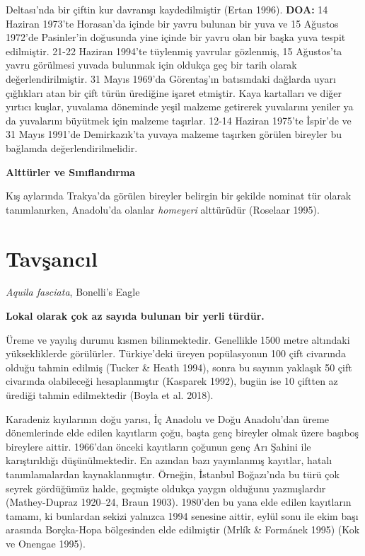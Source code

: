 \documentclass[
  letterpaper,
  DIV=11,
  numbers=noendperiod]{scrreprt}
\begin{document}
Deltası'nda bir çiftin kur davranışı kaydedilmiştir (Ertan 1996).
\textbf{DOA:} 14 Haziran 1973'te Horasan'da içinde bir yavru bulunan bir
yuva ve 15 Ağustos 1972'de Pasinler'in doğusunda yine içinde bir yavru
olan bir başka yuva tespit edilmiştir. 21-22 Haziran 1994'te tüylenmiş
yavrular gözlenmiş, 15 Ağustos'ta yavru görülmesi yuvada bulunmak için
oldukça geç bir tarih olarak değerlendirilmiştir. 31 Mayıs 1969'da
Görentaş'ın batısındaki dağlarda uyarı çığlıkları atan bir çift türün
ürediğine işaret etmiştir. Kaya kartalları ve diğer yırtıcı kuşlar,
yuvalama döneminde yeşil malzeme getirerek yuvalarını yeniler ya da
yuvalarını büyütmek için malzeme taşırlar. 12-14 Haziran 1975'te
İspir'de ve 31 Mayıs 1991'de Demirkazık'ta yuvaya malzeme taşırken
görülen bireyler bu bağlamda değerlendirilmelidir.

\textbf{Alttürler ve Sınıflandırma}

Kış aylarında Trakya'da görülen bireyler belirgin bir şekilde nominat
tür olarak tanımlanırken, Anadolu'da olanlar \emph{homeyeri} alttürüdür
(Roselaar 1995).

\section{Tavşancıl}\label{tavux15fancux131l}

\emph{Aquila fasciata}, Bonelli's Eagle

\textbf{Lokal olarak çok az sayıda bulunan bir yerli türdür.}

Üreme ve yayılış durumu kısmen bilinmektedir. Genellikle 1500 metre
altındaki yüksekliklerde görülürler. Türkiye'deki üreyen popülasyonun
100 çift civarında olduğu tahmin edilmiş (Tucker \& Heath 1994), sonra
bu sayının yaklaşık 50 çift civarında olabileceği hesaplanmıştır
(Kasparek 1992), bugün ise 10 çiftten az ürediği tahmin edilmektedir
(Boyla et al. 2018).

Karadeniz kıyılarının doğu yarısı, İç Anadolu ve Doğu Anadolu'dan üreme
dönemlerinde elde edilen kayıtların çoğu, başta genç bireyler olmak
üzere başıboş bireylere aittir. 1966'dan önceki kayıtların çoğunun genç
Arı Şahini ile karıştırıldığı düşünülmektedir. En azından bazı
yayınlanmış kayıtlar, hatalı tanımlamalardan kaynaklanmıştır. Örneğin,
İstanbul Boğazı'nda bu türü çok seyrek gördüğümüz halde, geçmişte
oldukça yaygın olduğunu yazmışlardır (Mathey-Dupraz 1920--24, Braun
1903). 1980'den bu yana elde edilen kayıtların tamamı, ki bunlardan
sekizi yalnızca 1994 senesine aittir, eylül sonu ile ekim başı arasında
Borçka-Hopa bölgesinden elde edilmiştir (Mrlík \& Formánek 1995) (Kok ve
Onengae 1995).
\end{document}
